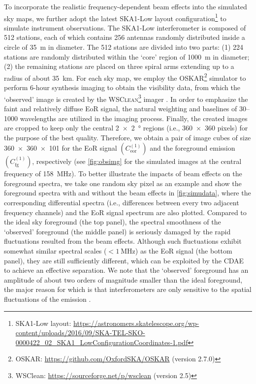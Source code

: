 \documentclass[fleqn,usenatbib]{mnras}
\newcommand{\R}[1]{\mathrm{#1}}
\begin{document}
To incorporate the realistic frequency-dependent beam effects into the
simulated sky maps, we further adopt the latest SKA1-Low layout
configuration\footnote{\raggedright%
  SKA1-Low layout:
  \url{https://astronomers.skatelescope.org/wp-content/uploads/2016/09/SKA-TEL-SKO-0000422_02_SKA1_LowConfigurationCoordinates-1.pdf}}
to simulate instrument observations.
The SKA1-Low interferometer is composed of 512 stations, each of which
contains 256 antennas randomly distributed inside a circle of
\SI{35}{\meter} in diameter.
The 512 stations are divided into two parts:
(1) 224 stations are randomly distributed within the `core' region of
\SI{1000}{\meter} in diameter;
(2) the remaining stations are placed on three spiral arms extending up to a
radius of about \SI{35}{\kilo\meter}.
For each sky map, we employ the \textsc{OSKAR}\footnote{%
  OSKAR: \url{https://github.com/OxfordSKA/OSKAR} (version 2.7.0)}
simulator \citep{mort2010} to perform 6-hour synthesis imaging
to obtain the visibility data, from which the `observed'
image is created by the \textsc{WSClean}\footnote{%
  WSClean: \url{https://sourceforge.net/p/wsclean} (version 2.5)}
imager \citep{offringa2014}.
In order to emphasize the faint and relatively diffuse EoR signal, the
natural weighting and baselines of \numrange{30}{1000} wavelengths are
utilized in the imaging process.
Finally, the created images are cropped to keep only the central
\SI{2 x 2}{\degree} regions (i.e., \num{360 x 360} pixels) for the
purpose of the best quality.
Therefore, we obtain a pair of image cubes of size
\num{360 x 360 x 101} for the EoR signal $\left( C_{\R{eor}}^{(1)} \right)$
and the foreground emission $\left( C_{\R{fg}}^{(1)} \right)$, respectively
(see \autoref{fig:obsimg} for the simulated images at the central frequency
of \SI{158}{\MHz}).
To better illustrate the impacts of beam effects on the foreground spectra,
we take one random sky pixel as an example and show the foreground
spectra with and without the beam effects in \autoref{fig:simudata}, where
the corresponding differential spectra (i.e., differences between every
two adjacent frequency channels) and the EoR signal spectrum are also
plotted.
Compared to the ideal sky foreground (the top panel), the spectral
smoothness of the `observed' foreground (the middle panel) is seriously
damaged by the rapid fluctuations resulted from the beam effects.
Although such fluctuations exhibit somewhat similar spectral scales
($< \SI{1}{\MHz}$) as the EoR signal (the bottom panel), they are
still sufficiently different, which can be exploited by the CDAE to achieve
an effective separation.
We note that the `observed' foreground has an amplitude of about two orders
of magnitude smaller than the ideal foreground, the major reason for which
is that interferometers are only sensitive to the spatial fluctuations of
the emission \citep[e.g.,][]{braun1985}.
\end{document}
